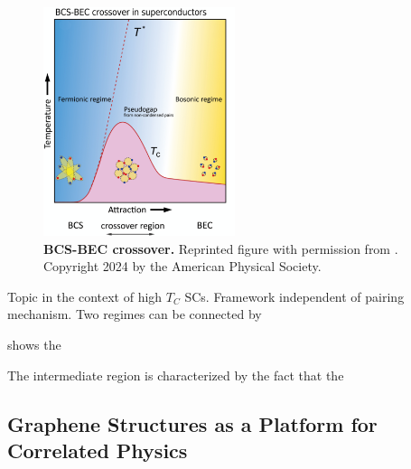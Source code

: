 \documentclass[../notes.tex]{subfiles}
\begin{document}
\begin{figure}
	\centering
	\includegraphics[width=0.5\textwidth]{images/BCS-BEC crossover.png}
	\caption{\textbf{BCS-BEC crossover.} Reprinted figure with permission from \cite{chenWhenSuperconductivityCrosses2024}. Copyright 2024 by the
		American Physical Society.}
	\label{fig:BCS-BEC-crossover}
\end{figure}
Topic in the context of high \(T_C\) SCs.
Framework independent of pairing mechanism.
Two regimes can be connected by 

 shows the 

The intermediate region is characterized by the fact that the 



\cite{chenWhenSuperconductivityCrosses2024}

\subsection*{Graphene Structures as a Platform for Correlated Physics}

\end{document}
